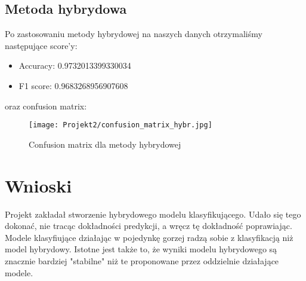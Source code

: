 \documentclass{article}
\begin{document}
\subsection{Metoda hybrydowa}
Po zastosowaniu metody hybrydowej na naszych danych otrzymaliśmy następujące score'y:

\begin{itemize}
    \item Accuracy: 0.9732013399330034
    \item F1 score: 0.9683268956907608
\end{itemize}
oraz confusion matrix:
\begin{figure}[H]
    \centering
    \texttt{[image: Projekt2/confusion\_matrix\_hybr.jpg]}
    \caption{Confusion matrix dla metody hybrydowej}
    \label{fig:enter-label}
\end{figure}

\section{Wnioski}
Projekt zakładał stworzenie hybrydowego modelu klasyfikującego. Udało się tego dokonać, nie tracąc dokładności predykcji, a wręcz tę dokładność poprawiając. Modele klasyfiujące działając w pojedynkę gorzej radzą sobie z klasyfikacją niż model hybrydowy. Istotne jest także to, że wyniki modelu hybrydowego są znacznie bardziej "stabilne" niż te proponowane przez oddzielnie działające modele.
\end{document}
